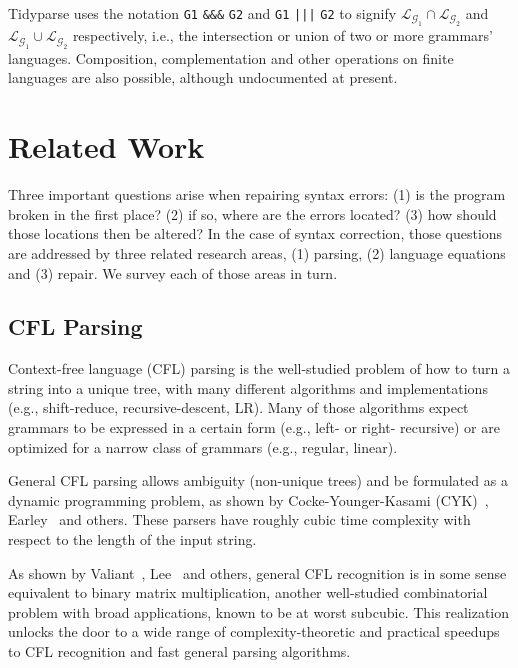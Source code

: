 \documentclass[sigplan,review,anonymous,acmsmall]{acmart}\settopmatter{printfolios=false,printccs=false,printacmref=false}
\begin{document}
\noindent Tidyparse uses the notation \texttt{G1} {\color{blue}\texttt{\&\&\&}} \texttt{G2} and \texttt{G1} {\color{blue}\texttt{|||}} \texttt{G2} to signify $\mathcal{L}_{\mathcal{G}_1}\cap\mathcal{L}_{\mathcal{G}_2}$ and $\mathcal{L}_{\mathcal{G}_1}\cup\mathcal{L}_{\mathcal{G}_2}$ respectively, i.e., the intersection or union of two or more grammars' languages. {Composition}, complementation and other operations on finite languages are also possible, although undocumented at present.

%

\section{Related Work}

Three important questions arise when repairing syntax errors: (1) is the program broken in the first place? (2) if so, where are the errors located? (3) how should those locations then be altered? In the case of syntax correction, those questions are addressed by three related research areas, (1) parsing, (2) language equations and (3) repair. We survey each of those areas in turn.

\subsection{CFL Parsing}

Context-free language (CFL) parsing is the well-studied problem of how to turn a string into a unique tree, with many different algorithms and implementations (e.g., shift-reduce, recursive-descent, LR). Many of those algorithms expect grammars to be expressed in a certain form (e.g., left- or right- recursive) or are optimized for a narrow class of grammars (e.g., regular, linear).

General CFL parsing allows ambiguity (non-unique trees) and be formulated as a dynamic programming problem, as shown by Cocke-Younger-Kasami (CYK)~\cite{sakai1961syntax}, Earley~\cite{earley1970efficient} and others. These parsers have roughly cubic time complexity with respect to the length of the input string.

As shown by Valiant~\cite{valiant1975general}, Lee~\cite{lee2002fast} and others, general CFL recognition is in some sense equivalent to binary matrix multiplication, another well-studied combinatorial problem with broad applications, known to be at worst subcubic. This realization unlocks the door to a wide range of complexity-theoretic and practical speedups to CFL recognition and fast general parsing algorithms.
\end{document}
